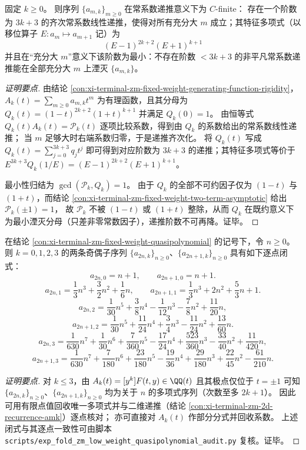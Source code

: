 \begin{conclusion}\label{con:xi-terminal-zm-fixed-weight-minimal-cc-recurrence-order}
固定 \(k\ge 0\)。
则序列 \(\{a_{m,k}\}_{m\ge 0}\) 在常系数递推意义下为 \(C\)-finite：
存在一个阶数为 \(3k+3\) 的齐次常系数线性递推，使得对所有充分大 \(m\) 成立；其特征多项式（以移位算子 \(E:a_m\mapsto a_{m+1}\) 记）为
\[
\boxed{\;(E-1)^{2k+2}(E+1)^{k+1}\;}
\]
并且在“充分大 \(m\)”意义下该阶数为最小：不存在阶数 \(<3k+3\) 的非平凡常系数递推能在全部充分大 \(m\) 上湮灭 \(\{a_{m,k}\}\)。
\end{conclusion}
\begin{proof}[证明要点]
由结论 \ref{con:xi-terminal-zm-fixed-weight-generating-function-rigidity}，
\(
A_k(t)=\sum_{m\ge 0}a_{m,k}t^m
\)
为有理函数，且其分母为
\(
Q_k(t)=(1-t)^{2k+2}(1+t)^{k+1}
\)
并满足 \(Q_k(0)=1\)。
由恒等式 \(Q_k(t)A_k(t)=\mathcal{P}_k(t)\) 逐项比较系数，得到由 \(Q_k\) 的系数给出的常系数线性递推；
当 \(m\) 足够大时右端系数归零，于是递推齐次化。
将 \(Q_k(t)\) 写成
\(
Q_k(t)=\sum_{j=0}^{3k+3}q_j t^j
\)
即可得到对应阶数为 \(3k+3\) 的递推；其特征多项式等价于
\(
E^{3k+3}Q_k(1/E)=(E-1)^{2k+2}(E+1)^{k+1}
\)。
\par
最小性归结为 \(\gcd(\mathcal{P}_k,Q_k)=1\)。
由于 \(Q_k\) 的全部不可约因子仅为 \((1-t)\) 与 \((1+t)\)，而结论 \ref{con:xi-terminal-zm-fixed-weight-two-term-asymptotic} 给出 \(\mathcal{P}_k(\pm1)=1\)，
故 \(\mathcal{P}_k\) 不被 \((1-t)\) 或 \((1+t)\) 整除，从而 \(Q_k\) 在既约意义下为最小湮灭分母（只差非零常数因子），递推阶数不可再降。证毕。
\end{proof}

\begin{conclusion}\label{con:xi-terminal-zm-fixed-weight-kle3-closed}
在结论 \ref{con:xi-terminal-zm-fixed-weight-quasipolynomial} 的记号下，令 \(n\ge 0\)。
则 \(k=0,1,2,3\) 的两条奇偶子序列 \(\{a_{2n,k}\}_{n\ge 0}\)、\(\{a_{2n+1,k}\}_{n\ge 0}\) 具有如下逐点闭式：
\[
a_{2n,0}=n+1,\qquad a_{2n+1,0}=n+1.
\]
\[
a_{2n,1}=\frac{1}{3}n^3+\frac{3}{2}n^2+\frac{1}{6}n,
\qquad
a_{2n+1,1}=\frac{1}{3}n^3+2n^2+\frac{5}{3}n+1.
\]
\[
a_{2n,2}=\frac{1}{30}n^5+\frac{3}{8}n^4-\frac{1}{12}n^3-\frac{7}{8}n^2+\frac{11}{20}n,
\]
\[
a_{2n+1,2}=\frac{1}{30}n^5+\frac{11}{24}n^4+\frac{3}{4}n^3-\frac{11}{24}n^2+\frac{13}{60}n.
\]
\[
a_{2n,3}=\frac{1}{630}n^7+\frac{1}{30}n^6+\frac{7}{360}n^5-\frac{17}{24}n^4+\frac{523}{360}n^3-\frac{33}{40}n^2+\frac{11}{420}n,
\]
\[
a_{2n+1,3}=\frac{1}{630}n^7+\frac{7}{180}n^6+\frac{23}{180}n^5-\frac{19}{36}n^4+\frac{29}{180}n^3+\frac{22}{45}n^2-\frac{61}{210}n.
\]
\end{conclusion}
\begin{proof}[证明要点]
对 \(k\le 3\)，由 \(A_k(t)=[y^k]F(t,y)\in\QQ(t)\) 且其极点仅位于 \(t=\pm1\) 可知
\(\{a_{2n,k}\}_{n\ge 0}\)、\(\{a_{2n+1,k}\}_{n\ge 0}\)
均为关于 \(n\) 的多项式序列（次数至多 \(2k+1\)）。
因此可用有限点值回收唯一多项式并与二维递推（结论 \ref{con:xi-terminal-zm-2d-recurrence-amk}）逐点核对；
亦可直接对 \(A_k(t)\) 作部分分式并回收系数。
上述闭式与其逐点一致性可由脚本 \texttt{scripts/exp\_fold\_zm\_low\_weight\_quasipolynomial\_audit.py} 复核。证毕。
\end{proof}

